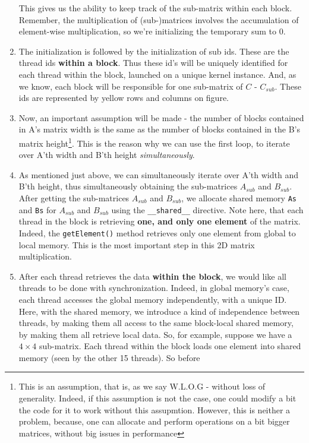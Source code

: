 \begin{enumerate}
        This gives us the ability to keep 
   track of the sub-matrix within each block. Remember, the multiplication 
   of (sub-)matrices involves the accumulation of element-wise multiplication, so we're initializing the temporary sum to $0$.
   \item The initialization is followed by the initialization of sub ids. These are the thread ids \textbf{within a block}.
   Thus these id's will be uniquely identified for each thread within the block, launched on a unique kernel instance. And, as we know, each block will be responsible 
   for one sub-matrix of $C$ - $C_{sub}$. These ids are represented by yellow rows and columns on figure.
   \item Now, an important assumption will be made - the number of blocks contained in A's matrix width is the same as the number of 
   blocks contained in the B's matrix height\footnote{This is an assumption, that is, as we say W.L.O.G - without loss of generality. 
   Indeed, if this assumption is not the case, one could modify a bit the code for it to work without this assupmtion.
   However, this is neither a problem, because, one can allocate and perform operations on a bit bigger matrices, without big issues in 
   performance}. This is the reason why we can use the first loop, to iterate over A'th width and B'th height \textit{simultaneously}. 
   \item As mentioned just above, we can simultaneously iterate over A'th width and B'th height, thus simultaneously obtaining the sub-matrices 
   $A_{sub}$ and $B_{sub}$. After getting the sub-matrices $A_{sub}$ and $B_{sub}$, we allocate shared memory \verb|As| and \verb|Bs| for 
   $A_{sub}$ and $B_{sub}$ using the \verb|__shared__| directive. Note here, that each thread in the block is retrieving \textbf{one, and only one element} of the matrix. 
   Indeed, the \verb|getElement()| method retrieves only one element from global to local memory. This is the most important step in this 2D matrix multiplication.
   \item After each thread retrieves the data \textbf{within the block}, we would like all threads to be done with synchronization. Indeed, in global memory's case, 
   each thread accesses the global memory independently, with a unique ID. Here, with the shared memory, we introduce a kind of independence between threads, by making them all access to the same block-local shared memory, by 
   making them all retrieve local data. So, for example, suppose we have a $4\times 4$ sub-matrix. Each thread within the block loads one element into shared memory (seen by the other 15 threads). So before 

\end{enumerate}
